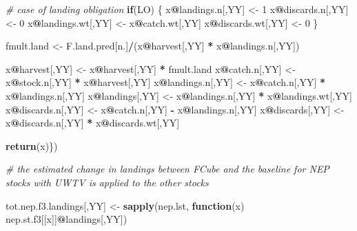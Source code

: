 \documentclass[
]{article}
\newenvironment{Shaded}{\begin{snugshade}}{\end{snugshade}}
\newcommand{\CommentTok}[1]{\textcolor[rgb]{0.56,0.35,0.01}{\textit{#1}}}
\newcommand{\ControlFlowTok}[1]{\textcolor[rgb]{0.13,0.29,0.53}{\textbf{#1}}}
\newcommand{\DecValTok}[1]{\textcolor[rgb]{0.00,0.00,0.81}{#1}}
\newcommand{\KeywordTok}[1]{\textcolor[rgb]{0.13,0.29,0.53}{\textbf{#1}}}
\newcommand{\NormalTok}[1]{#1}
\newcommand{\OperatorTok}[1]{\textcolor[rgb]{0.81,0.36,0.00}{\textbf{#1}}}
\newcommand{\StringTok}[1]{\textcolor[rgb]{0.31,0.60,0.02}{#1}}
\begin{document}
\begin{Shaded}
\begin{Highlighting}[]
{{{               \CommentTok{# case of landing obligation}
               \ControlFlowTok{if}\NormalTok{(LO) \{}
\NormalTok{               x}\OperatorTok{@}\NormalTok{landings.n[,YY] <-}\StringTok{ }\DecValTok{1}
\NormalTok{               x}\OperatorTok{@}\NormalTok{discards.n[,YY] <-}\StringTok{ }\DecValTok{0}
\NormalTok{               x}\OperatorTok{@}\NormalTok{landings.wt[,YY] <-}\StringTok{ }\NormalTok{x}\OperatorTok{@}\NormalTok{catch.wt[,YY]}
\NormalTok{               x}\OperatorTok{@}\NormalTok{discards.wt[,YY] <-}\StringTok{ }\DecValTok{0}
\NormalTok{               \}}

\NormalTok{               fmult.land <-}\StringTok{ }\NormalTok{F.land.pred[n.]}\OperatorTok{/}\NormalTok{(x}\OperatorTok{@}\NormalTok{harvest[,YY] }\OperatorTok{*}\StringTok{ }\NormalTok{x}\OperatorTok{@}\NormalTok{landings.n[,YY])}

\NormalTok{               x}\OperatorTok{@}\NormalTok{harvest[,YY]    <-}\StringTok{ }\NormalTok{x}\OperatorTok{@}\NormalTok{harvest[,YY] }\OperatorTok{*}\StringTok{ }\NormalTok{fmult.land}
\NormalTok{               x}\OperatorTok{@}\NormalTok{catch.n[,YY]    <-}\StringTok{ }\NormalTok{x}\OperatorTok{@}\NormalTok{stock.n[,YY] }\OperatorTok{*}\StringTok{ }\NormalTok{x}\OperatorTok{@}\NormalTok{harvest[,YY]}
\NormalTok{               x}\OperatorTok{@}\NormalTok{landings.n[,YY] <-}\StringTok{ }\NormalTok{x}\OperatorTok{@}\NormalTok{catch.n[,YY] }\OperatorTok{*}\StringTok{ }\NormalTok{x}\OperatorTok{@}\NormalTok{landings.n[,YY]}
\NormalTok{               x}\OperatorTok{@}\NormalTok{landings[,YY]   <-}\StringTok{ }\NormalTok{x}\OperatorTok{@}\NormalTok{landings.n[,YY] }\OperatorTok{*}\StringTok{ }\NormalTok{x}\OperatorTok{@}\NormalTok{landings.wt[,YY]}
\NormalTok{               x}\OperatorTok{@}\NormalTok{discards.n[,YY] <-}\StringTok{ }\NormalTok{x}\OperatorTok{@}\NormalTok{catch.n[,YY] }\OperatorTok{-}\StringTok{ }\NormalTok{x}\OperatorTok{@}\NormalTok{landings.n[,YY]}
\NormalTok{               x}\OperatorTok{@}\NormalTok{discards[,YY]   <-}\StringTok{ }\NormalTok{x}\OperatorTok{@}\NormalTok{discards.n[,YY] }\OperatorTok{*}\StringTok{ }\NormalTok{x}\OperatorTok{@}\NormalTok{discards.wt[,YY]}

\KeywordTok{return}\NormalTok{(x)\})}

\CommentTok{# the estimated change in landings between FCube and the baseline for NEP stocks with UWTV is applied to the other stocks}

\NormalTok{tot.nep.f3.landings[,YY] <-}\StringTok{ }\KeywordTok{sapply}\NormalTok{(nep.lst, }\ControlFlowTok{function}\NormalTok{(x) nep.st.f3[[x]]}\OperatorTok{@}\NormalTok{landings[,YY])}

}}}
\end{Highlighting}
\end{Shaded}
\end{document}
